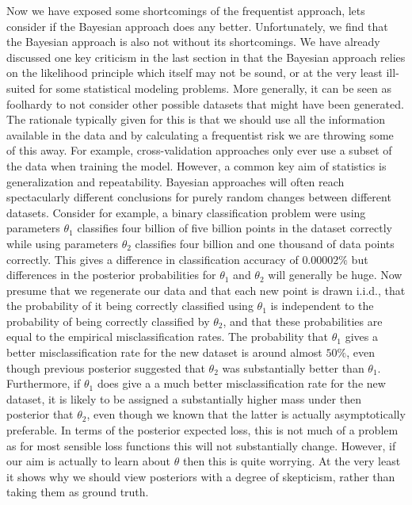Now we have exposed some shortcomings of the frequentist approach, lets consider if the Bayesian approach does any better.
Unfortunately, we find that the Bayesian approach is also not without its shortcomings.  We have already discussed one
key criticism in the last section in that the Bayesian approach relies on the likelihood principle which itself may not
be sound, or at the very least ill-suited for some statistical modeling problems.  More generally, it can be seen as
foolhardy to not consider other possible datasets that might have been generated.  The rationale typically given for
this is that we should use all the information available in the data and by calculating a frequentist risk we are throwing
some of this away.  For example, cross-validation approaches only ever use a subset of the data when training the model.
However, a common key aim of statistics is generalization and repeatability.  Bayesian approaches will often reach
spectacularly different conclusions for purely random changes between different datasets.  Consider for example, a binary
classification
problem were using parameters $\theta_1$ classifies four billion of five billion points in the dataset correctly 
while using parameters $\theta_2$
classifies four billion and one thousand of data points correctly.  This gives a difference in classification accuracy 
of $0.00002\%$ but differences in the posterior probabilities for $\theta_1$ and $\theta_2$ will generally
be huge.
Now presume that we regenerate our data and that each new point is drawn i.i.d.,
 that the probability of it being correctly classified using $\theta_1$ is independent to the probability of
being correctly classified by $\theta_2$, and that these probabilities are equal to the empirical misclassification
rates.  The probability that $\theta_1$ gives a better misclassification rate for the new dataset is around
almost $50\%$, even though previous posterior suggested that $\theta_2$ was substantially better than $\theta_1$.
Furthermore, if $\theta_1$ does give a a much better misclassification rate for the new dataset, it is likely 
to be assigned a substantially higher mass under then posterior that $\theta_2$, even though we known that 
the latter is actually asymptotically preferable.  In terms of the posterior expected loss, this is not much of a problem
as for most sensible loss functions this will not substantially change.  However, if our aim is actually to learn 
about $\theta$ then this is quite worrying.  At the very least it shows why we should view posteriors with
a degree of skepticism, rather than taking them as ground truth.

